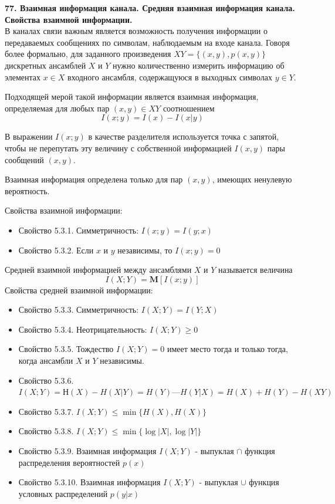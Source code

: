 \documentclass[14pt]{article}
\begin{document}
\bigskip
\textbf{77. Взаимная информация канала. Средняя взаимная информация канала. Свойства взаимной информации.} \\

В каналах связи важным является возможность получения информации о передаваемых сообщениях по символам, наблюдаемым на входе канала. Говоря более формально, для заданного произведения \(XY = \{(x, y), p(x, y)\}\) дискретных ансамблей \(X\) и \(Y\) нужно количественно измерить информацию об элементах \(x \in X\) входного ансамбля, содержащуюся в выходных символах \(y \in Y\).

Подходящей мерой такой информации является взаимная информация, определяемая для любых пар \((x,y) \in XY\) соотношением \[ I(x;y) = I(x) - I(x|y) \]

В выражении \(I(x;y)\) в качестве разделителя используется точка с запятой, чтобы не перепутать эту величину с собственной информацией \(I(x,y)\) пары сообщений \((x,y)\).

Взаимная информация определена только для пар \((x,y)\), имеющих ненулевую вероятность.

Свойства взаимной информации:
\begin{itemize}
    \item Свойство 5.3.1. Симметричность: \(I(x;y) = I(y;x)\)
    \item Свойство 5.3.2. Если \(x\) и \(y\) независимы, то \(I(x;y) = 0\)
\end{itemize}

Средней взаимной информацией между ансамблями \(X\) и \(Y\) называется величина \[ I(X;Y) = \textbf{M}[I(x;y)] \]
Свойства средней взаимной информации:
\begin{itemize}
    \item Свойство 5.3.3. Симметричность: \(I(X;Y) = I(Y;X)\)
    \item Свойство 5.3.4. Неотрицательность: \(I(X;Y) \geq 0\)
    \item Свойство 5.3.5. Тождество \(I(X;Y) = 0\) имеет место тогда и только тогда, когда ансамбли \(X\) и \(Y\) независимы.
    \item Свойство 5.3.6. \(I(X;Y)= Н(X) - H(X|Y) = H(Y)— H(Y|X) = H(X) + H(Y) - H(XY)\)
    \item Свойство 5.3.7. \(I(X;Y) \leq \min\{H(X), H(X)\}\)
    \item Свойство 5.3.8. \(I(X;Y) \leq \min\{\log|X|, \log|Y|\}\)
    \item Свойство 5.3.9. Взаимная информация \(I(X;Y)\) - выпуклая \(\cap\) функция распределения вероятностей \(p(x)\)
    \item Свойство 5.3.10. Взаимная информация \(I(X;Y)\) - выпуклая \(\cup\) функция условных распределений \(p(y|x)\)
\end{itemize}
\end{document}
